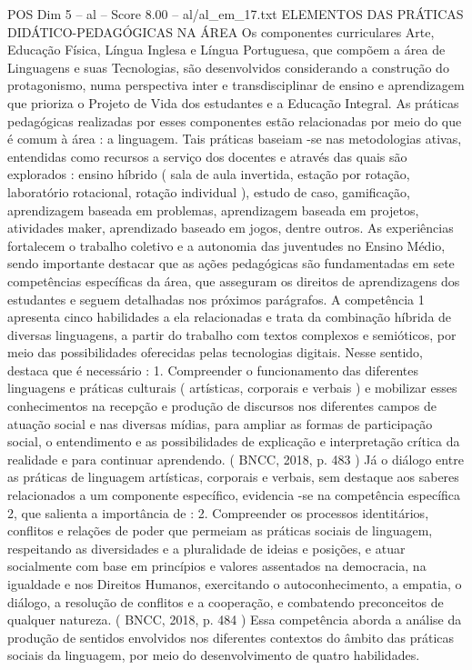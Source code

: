 \begin{textsample}{POS Dim 5 – al – Score 8.00 – al/al\_em\_17.txt}  \label{ex:f5_pos_046}
ELEMENTOS DAS PRÁTICAS DIDÁTICO-PEDAGÓGICAS NA ÁREA Os componentes curriculares Arte, Educação Física, Língua Inglesa e Língua Portuguesa, que compõem a área de Linguagens e suas Tecnologias, são desenvolvidos considerando a construção do protagonismo, numa perspectiva inter e transdisciplinar de ensino e aprendizagem que prioriza o Projeto de Vida dos estudantes e a Educação Integral.
As práticas pedagógicas realizadas por esses componentes estão relacionadas por meio do que é comum à área : a linguagem.
Tais práticas baseiam -se nas metodologias ativas, entendidas como recursos a serviço dos docentes e através das quais são explorados : ensino híbrido ( sala de aula invertida, estação por rotação, laboratório rotacional, rotação individual ), estudo de caso, gamificação, aprendizagem baseada em problemas, aprendizagem baseada em projetos, atividades maker, aprendizado baseado em jogos, dentre outros.
As experiências fortalecem o trabalho coletivo e a autonomia das juventudes no Ensino Médio, sendo importante destacar que as ações pedagógicas são fundamentadas em sete competências específicas da área, que asseguram os direitos de aprendizagens dos estudantes e seguem detalhadas nos próximos parágrafos.
A competência 1 apresenta cinco habilidades a ela relacionadas e trata da combinação híbrida de diversas linguagens, a partir do trabalho com textos complexos e semióticos, por meio das possibilidades oferecidas pelas tecnologias digitais.
Nesse sentido, destaca que é necessário : 1.
Compreender o funcionamento das diferentes linguagens e práticas culturais ( artísticas, corporais e verbais ) e mobilizar esses conhecimentos na recepção e produção de discursos nos diferentes campos de atuação social e nas diversas mídias, para ampliar as formas de participação social, o entendimento e as possibilidades de explicação e interpretação crítica da realidade e para continuar aprendendo. ( BNCC, 2018, p. 483 ) Já o diálogo entre as práticas de linguagem artísticas, corporais e verbais, sem destaque aos saberes relacionados a um componente específico, evidencia -se na competência específica 2, que salienta a importância de : 2.
Compreender os processos identitários, conflitos e relações de poder que permeiam as práticas sociais de linguagem, respeitando as diversidades e a pluralidade de ideias e posições, e atuar socialmente com base em princípios e valores assentados na democracia, na igualdade e nos Direitos Humanos, exercitando o autoconhecimento, a empatia, o diálogo, a resolução de conflitos e a cooperação, e combatendo preconceitos de qualquer natureza. ( BNCC, 2018, p. 484 ) Essa competência aborda a análise da produção de sentidos envolvidos nos diferentes contextos do âmbito das práticas sociais da linguagem, por meio do desenvolvimento de quatro habilidades.

\end{textsample}
